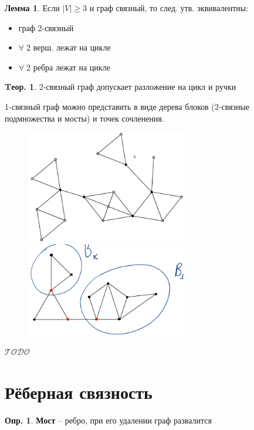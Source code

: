 \documentclass[a4paper,12pt]{article}
\theoremstyle{definition}
\newtheorem{definition}{Опр.}[section]
\theoremstyle{definition}
\newtheorem{theorem}{Tеор.}[section]
\newtheorem{lemma}{Лемма}[section]
\def\iiany{$\forall\;$}
\def\iiTODO{\guillemotleft$\mathcal{TODO}$\guillemotright\textellipsis}
\begin{document}
\begin{lemma}
	Если $|V| \geqslant 3$ и граф связный, то след. утв. эквивалентны:
	\begin{itemize}
		\item  граф 2-связный
		\item  \iiany 2 верш. лежат на цикле
		\item  \iiany 2 ребра лежат на цикле
	\end{itemize}
\end{lemma}

\begin{theorem}
	2-связный граф допускает разложение на цикл и ручки
\end{theorem}

1-связный граф можно представить в виде дерева блоков (2-связные подмножества и мосты) и точек сочленения.
\begin{figure}[H]
	\centering
	\includegraphics[width=7cm]{1conn-tree-of-blocks-and-junctons-fig1.png}
	\includegraphics[width=7cm]{1conn-tree-of-blocks-and-junctons-fig2.png}
\end{figure}


\iiTODO



\section{Рёберная связность}

\begin{definition}
	\textbf{Мост} -- ребро, при его удалении граф развалится
\end{definition}
\end{document}
